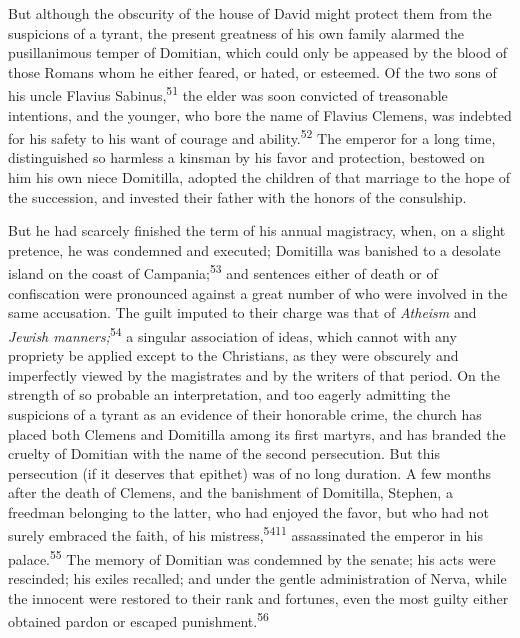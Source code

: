 

But although the obscurity of the house of David might protect
them from the suspicions of a tyrant, the present greatness of
his own family alarmed the pusillanimous temper of Domitian,
which could only be appeased by the blood of those Romans whom he
either feared, or hated, or esteemed. Of the two sons of his
uncle Flavius Sabinus,\textsuperscript{51} the elder was soon convicted of
treasonable intentions, and the younger, who bore the name of
Flavius Clemens, was indebted for his safety to his want of
courage and ability.\textsuperscript{52} The emperor for a long time,
distinguished so harmless a kinsman by his favor and protection,
bestowed on him his own niece Domitilla, adopted the children of
that marriage to the hope of the succession, and invested their
father with the honors of the consulship.



But he had scarcely finished the term of his annual magistracy,
when, on a slight pretence, he was condemned and executed;
Domitilla was banished to a desolate island on the coast of
Campania;\textsuperscript{53} and sentences either of death or of confiscation
were pronounced against a great number of who were involved in
the same accusation. The guilt imputed to their charge was that
of \textit{Atheism} and \textit{Jewish manners;}\textsuperscript{54} a singular association of
ideas, which cannot with any propriety be applied except to the
Christians, as they were obscurely and imperfectly viewed by the
magistrates and by the writers of that period. On the strength of
so probable an interpretation, and too eagerly admitting the
suspicions of a tyrant as an evidence of their honorable crime,
the church has placed both Clemens and Domitilla among its first
martyrs, and has branded the cruelty of Domitian with the name of
the second persecution. But this persecution (if it deserves that
epithet) was of no long duration. A few months after the death of
Clemens, and the banishment of Domitilla, Stephen, a freedman
belonging to the latter, who had enjoyed the favor, but who had
not surely embraced the faith, of his mistress,\textsuperscript{5411} assassinated
the emperor in his palace.\textsuperscript{55} The memory of Domitian was
condemned by the senate; his acts were rescinded; his exiles
recalled; and under the gentle administration of Nerva, while the
innocent were restored to their rank and fortunes, even the most
guilty either obtained pardon or escaped punishment.\textsuperscript{56}

